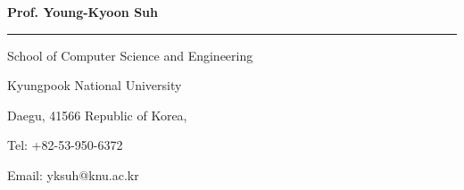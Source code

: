\documentclass{letter} %
\begin{document}
\signature{Young-Kyoon Suh}           %
\longindentation=0pt                       %
\let\raggedleft\raggedright                %
 
\begin{letter}{
%
}

\begin{flushleft}
{\large\bf Prof. Young-Kyoon Suh}
\end{flushleft}
\medskip\hrule height 1pt
\begin{flushright}
\hfill School of Computer Science and Engineering
\end{flushright}
\vspace{-.15in}
\begin{flushright}
\hfill Kyungpook National University 
\end{flushright}
\vspace{-.15in}
\begin{flushright}
\hfill Daegu, 41566 Republic of Korea, 
\end{flushright}
\vspace{-.15in}
\begin{flushright}
\hfill Tel: +82-53-950-6372
\end{flushright}
\vspace{-.15in}
\begin{flushright}
\hfill Email: yksuh@knu.ac.kr
\end{flushright} 

 

\end{letter}
\end{document}
